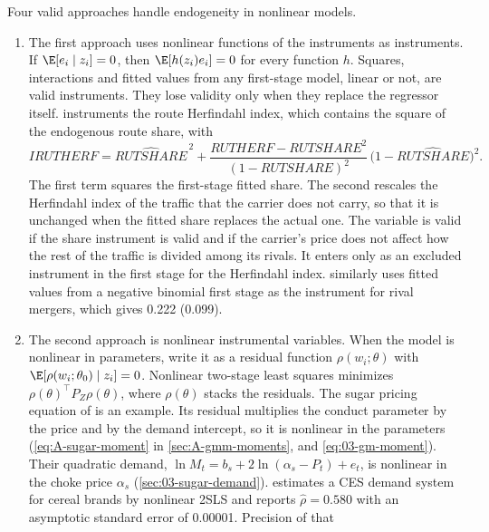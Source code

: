 Four valid approaches handle endogeneity in nonlinear models.
\begin{enumerate}[label=(\roman*)]
\item The first approach uses nonlinear functions of the instruments as instruments. If $\E[e_i \mid z_i] = 0$, then
  $\E[h(z_i)e_i] = 0$ for every function $h$. Squares, interactions and fitted values from any first-stage
  model, linear or not, are valid instruments. They lose validity only when they replace the regressor
  itself. \citet[p.~353]{Borenstein1989} instruments the route Herfindahl index, which contains the square of
  the endogenous route share, with
  \begin{equation}\label{eq:A-irutherf}
  \mathit{IRUTHERF} = \widehat{\mathit{RUTSHARE}}^{\,2} + \frac{\mathit{RUTHERF} - \mathit{RUTSHARE}^2}
  {(1 - \mathit{RUTSHARE})^2}\,\bigl(1 - \widehat{\mathit{RUTSHARE}}\bigr)^2 .
  \end{equation}
  The first term squares the first-stage fitted share. The second rescales the Herfindahl index of the traffic
  that the carrier does not carry, so that it is unchanged when the fitted share replaces the actual one. The
  variable is valid if the share instrument is valid and if the carrier's price does not affect how the rest
  of the traffic is divided among its rivals. It enters only as an excluded instrument in the first stage for
  the Herfindahl index. \citet[Appendix Table 1]{Dafny2005} similarly uses fitted values from a negative
  binomial first stage as the instrument for rival mergers, which gives 0.222 (0.099).
\item The second approach is nonlinear instrumental variables. When the model is nonlinear in parameters, write it as a
  residual function $\rho(w_i; \theta)$ with $\E[\rho(w_i; \theta_0) \mid z_i] = 0$. Nonlinear two-stage least
  squares \citep{Amemiya1974} minimizes $\rho(\theta)^\top P_Z\rho(\theta)$, where $\rho(\theta)$ stacks the residuals.
  The sugar pricing equation of \citet{GenesoveMullin1998} is an example. Its residual multiplies the
  conduct parameter by the price and by the demand intercept, so it is nonlinear in the parameters
  (\cref{eq:A-sugar-moment} in \cref{sec:A-gmm-moments}, and \cref{eq:03-gm-moment}). Their quadratic demand,
  $\ln M_t = b_s + 2\ln(\alpha_s - P_t) + e_t$, is nonlinear in the choke price $\alpha_s$
  (\cref{sec:03-sugar-demand}). \citet[p.~231]{Hausman1997} estimates a CES demand system for cereal brands by
  nonlinear 2SLS and reports $\hat\rho = 0.580$ with an asymptotic standard error of 0.00001. Precision of that

\end{enumerate}
